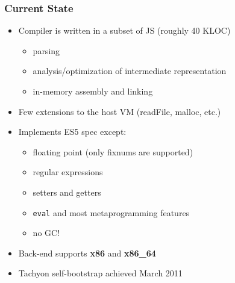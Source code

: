 \begin{frame}
\frametitle{\bf Current State}

  \begin{itemize}

  \item Compiler is written in a subset of JS (roughly 40 KLOC)
    \begin{itemize}
    \item parsing
    \item analysis/optimization of intermediate representation
    \item in-memory assembly and linking
    \end{itemize}
    \smallskip

  \item Few extensions to the host VM (readFile, malloc, etc.)
    \smallskip

  \item Implements ES5 spec except:
    \begin{itemize}
    \item floating point (only fixnums are supported)
    \item regular expressions
    \item setters and getters
    \item {\tt eval} and most metaprogramming features
    \item no GC!
    \end{itemize}
    \smallskip

  \item Back-end supports {\bf x86} and {\bf x86\_64}
    \smallskip

  \item Tachyon self-bootstrap achieved March 2011
    \smallskip

  \end{itemize}
\end{frame}

